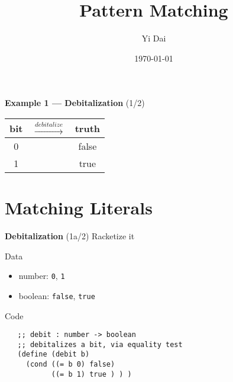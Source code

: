 \documentclass[12pt]{beamer}
\title{\bf Pattern Matching}
\author{Yi Dai}
\date{\today}
\begin{document}
\begin{frame}[plain]
 \maketitle
\end{frame}

\begin{frame}[fragile]{{\bf Example 1 --- Debitalization} (1/2)}
 \large
 \begin{table}
  \centering
  \begin{tabular}{ccc}
   bit & $\overset{debitalize}{\longrightarrow}$ & truth \\
   \hline
   0   &                                         & false \\
   1   &                                         & true  \\
  \end{tabular}
 \end{table}
\end{frame}

\section{Matching Literals}

\begin{frame}[fragile]{{\bf Debitalization} (1a/2)}
 Racketize it

 \pause

 Data
 \begin{itemize}
  \item number: \verb|0|, \verb|1|
  \item boolean: \verb|false|, \verb|true|
 \end{itemize}

 \pause

 Code
 {\footnotesize
  \begin{verbatim}
   ;; debit : number -> boolean
   ;; debitalizes a bit, via equality test
   (define (debit b)
     (cond ((= b 0) false)
           ((= b 1) true ) ) )
  \end{verbatim}
 }
\end{frame}
\end{document}
